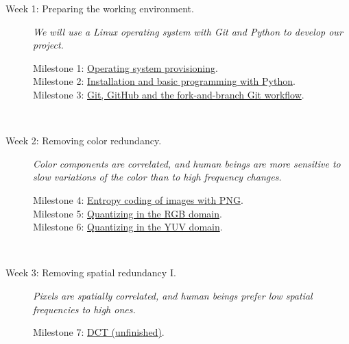 \begin{description}
\item [Week 1: {\normalfont Preparing the working
    environment.}] \emph{We will use a Linux operating system with
  Git and Python to develop our project.}
  \begin{description}
  \item [Milestone 1: {\normalfont \href{https://sistemas-multimedia.github.io/milestones/01-provisioning/}{Operating system provisioning}.}]
  \item [Milestone 2: {\normalfont \href{https://sistemas-multimedia.github.io/milestones/02-python/}{Installation and basic programming with Python}.}]
  \item [Milestone 3: {\normalfont \href{https://sistemas-multimedia.github.io/milestones/03-git/}{Git, GitHub and the fork-and-branch Git workflow}.}]
  \end{description}
  ~\newline

\item [Week 2: {\normalfont Removing color redundancy.}] \emph{Color
    components are correlated, and human beings are more sensitive to
    slow variations of the color than to high frequency changes.}
  \begin{description}
  \item [Milestone 4: {\normalfont \href{https://sistemas-multimedia.github.io/milestones/04-Motion_PNG/}{Entropy coding of images with PNG}.}]
  \item [Milestone 5: {\normalfont \href{https://sistemas-multimedia.github.io/milestones/05-RGB_quantization/}{Quantizing in the RGB domain}.}]
  \item [Milestone 6: {\normalfont \href{https://sistemas-multimedia.github.io/milestones/06-YUV_quantization/}{Quantizing in the YUV domain}.}] %
  \end{description}
  ~\newline

\item [Week 3: {\normalfont Removing spatial redundancy I.}]
  \emph{Pixels are spatially correlated, and human beings prefer low
    spatial frequencies to high ones.}
  \begin{description}
  \item [Milestone 7: {\normalfont \href{}{DCT (unfinished)}.}] %
  \end{description}
  ~\newline


\end{description}
